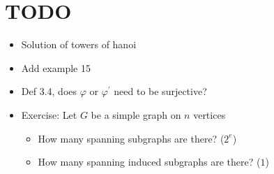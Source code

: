 \section{TODO}\par
\begin{itemize}
  \item Solution of towers of hanoi
  \item Add example 15
  \item Def 3.4, does $\varphi$ or $\varphi^{\prime}$ need to be surjective?
  \item Exercise: Let $G$ be a simple graph on $n$ vertices
    \begin{itemize}
      \item How many spanning subgraphs are there? ($2^e$)
      \item How many spanning induced subgraphs are there? ($1$)
    \end{itemize}
\end{itemize}
